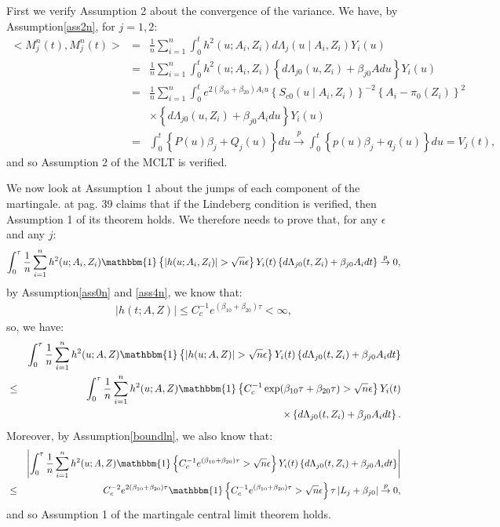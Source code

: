 \documentclass[11pt]{article}
\newcommand{\eqnn}{\begin{eqnarray*}}
\newcommand{\een}{\end{eqnarray*}}
\begin{document}
First we verify Assumption 2 about the convergence of the variance.
We have, by Assumption\ref{ass2n}, for $j=1,2$:
\eqnn
<{M}_j^n(t),{M}_j^n(t)>&=&\frac{1}{n}\sum_{i=1}^n\int_0^t h^2(u; A_i,Z_i) d\Lambda_{j}(u \mid A_i, Z_i)Y_i(u)\\
&=&\frac{1}{n}\sum_{i=1}^n\int_0^t h^2(u; A_i,Z_i) \left\{d\Lambda_{j0}(u,Z_i) + \beta_{j0}Adu\right\}Y_i(u)\\
&=&\frac{1}{n}\sum_{i=1}^n\int_0^t e^{2(\beta_{10}  + \beta_{20} )A_i u}\left\{S_{c0}(u \mid A_i,Z_i)\right\}^{-2} \left\{A_i-\pi_0(Z_i)\right\}^2\\&&\times\left\{d\Lambda_{j0}(u,Z_i) + \beta_{j0}A_idu\right\}Y_i(u)\nonumber\\
&=&\int_0^t  \left\{P(u)\beta_j+Q_j(u)\right\}du\overset{p}{\rightarrow} \int_0^t  \left\{p(u)\beta_j+q_j(u)\right\}du=V_j(t),
\een
and so Assumption 2 of the MCLT is verified.

We now look at Assumption 1 about the jumps of each component of the martingale. \cite{rebolledo1978applications} at pag. 39 claims that if the Lindeberg condition is verified, then Assumption 1 of its theorem holds.
We therefore needs to prove that, for any $\epsilon$ and any $j$:
\eqnn
\int_0^\tau \frac{1}{n}\sum_{i=1}^n h^2(u ; A_i,Z_i) \mathbbm{1}\left\{\left|h(u ; A_i,Z_i)\right|>\sqrt{n}\epsilon\right\}Y_i(t)\left\{d\Lambda_{j0}(t, Z_i) + \beta_{j0} A_idt\right\} \overset{p}{\rightarrow} 0,
\een
by Assumption\ref{ass0n} and \ref{ass4n}, we know that: 
\eqnn
\left|h(t; A,Z)\right|\leq C^{-1}_ce^{ (\beta_{10}  + \beta_{20}) \tau}<\infty,
\een
so, we have:
\eqnn
&&\int_0^\tau \frac{1}{n}\sum_{i=1}^n h^2(u ; A,Z) \mathbbm{1}\left\{\left|h(u ; A,Z)\right|>\sqrt{n}\epsilon\right\}Y_i(t)\left\{d\Lambda_{j0}(t, Z_i) + \beta_{j0} A_idt\right\} \\
&\leq& \int_0^\tau \frac{1}{n}\sum_{i=1}^n h^2(u ; A,Z) \mathbbm{1}\left\{C^{-1}_c\exp(\beta_{10}\tau +\beta_{20} \tau)>\sqrt{n}\epsilon\right\}Y_i(t)
\\
&&\times\left\{d\Lambda_{j0}(t, Z_i) + \beta_{j0} A_idt\right\}.
\een
Moreover, by Assumption\ref{boundln}, we also know that: 
\eqnn
&&\left| \int_0^\tau \frac{1}{n}\sum_{i=1}^n h^2(u ; A,Z) \mathbbm{1}\left\{C^{-1}_ce^{ (\beta_{10}  + \beta_{20}) \tau}>\sqrt{n}\epsilon\right\}Y_i(t)\left\{d\Lambda_{j0}(t, Z_i) + \beta_{j0} A_idt\right\}\right| \\
 &\leq & C^{-2}_ce^{2(\beta_{10}  +\beta_{20})\tau} \mathbbm{1}\left\{C^{-1}_ce^{ (\beta_{10}  + \beta_{20})\tau}>\sqrt{n}\epsilon\right\}\tau \left|L_j + \beta_{j0} \right|  \overset{p}{\rightarrow} 0,
\een
and so Assumption 1 of the martingale central limit theorem holds.
 
\end{document}
